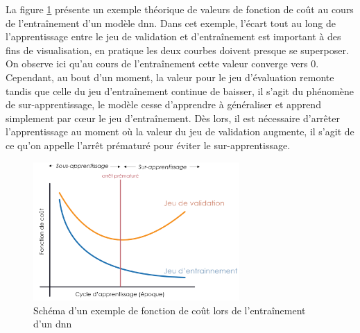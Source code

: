 La figure \ref{fig:loss_func} présente un exemple théorique de valeurs de fonction de coût au cours de l'entraînement d'un modèle \gls{dnn}. Dans cet exemple, l'écart tout au long de l'apprentissage entre le jeu de validation et d'entraînement est important à des fins de visualisation, en pratique les deux courbes doivent presque se superposer. On observe ici qu'au cours de l'entraînement cette valeur converge vers 0. Cependant, au bout d'un moment, la valeur pour le jeu d'évaluation remonte tandis que celle du jeu d'entraînement continue de baisser, il s'agit du phénomène de sur-apprentissage, le modèle cesse d'apprendre à généraliser et apprend simplement par cœur le jeu d'entraînement. Dès lors, il est nécessaire d'arrêter l'apprentissage au moment où la valeur du jeu de validation augmente, il s'agit de ce qu'on appelle l'arrêt prématuré pour éviter le sur-apprentissage.
\begin{figure}[!ht]
 \centering
 \includegraphics[width=0.7\textwidth]{figures/loss_function.png}
 \caption[Schéma d'un exemple de fonction de coût lors d'un entraînement]{Schéma d'un exemple de fonction de coût lors de l'entraînement d'un \gls{dnn}}
 \label{fig:loss_func}
\end{figure}
